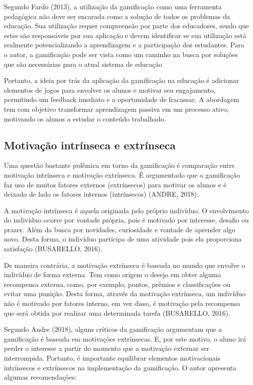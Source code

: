 \documentclass[
	12pt,				%
	oneside,			%
	a4paper,			%
	english,			%
	french,				%
	spanish,			%
	brazil,				%
	]{abntex2}
\begin{document}
Segundo Fardo (2013), a utilização da gamificação como uma ferramenta pedagógica não deve ser encarada como a solução de todos os problemas da educação. Sua utilização requer compreensão por parte dos educadores, sendo que estes são responsáveis por sua aplicação e devem identificar se sua utilização está realmente potencializando a aprendizagem e a participação dos estudantes. Para o autor, a gamificação pode ser vista como um caminho na busca por soluções que são necessárias para o atual sistema de educação

Portanto, a ideia por trás da aplicação da gamificação na educação é adicionar elementos de jogos para envolver os alunos e motivar seu engajamento, permitindo um feedback imediato e a oportunidade de fracassar. A abordagem tem com objetivo transformar aprendizagem passiva em um processo ativo, motivando os alunos a estudar o conteúdo trabalhado.

\subsection{Motivação intrínseca e extrínseca}

Uma questão bastante polêmica em torno da gamificação é comparação entre motivação intrínseca e motivação extrínseca. É argumentado que a gamificação faz uso de muitos fatores externos (extrínsecos) para motivar os alunos e é deixado de lado os fatores internos (intrínsecos) (ANDRE, 2018).

A motivação intrínseca é aquela originada pelo próprio indivíduo. O envolvimento do indivíduo ocorre por vontade própria,  pois é motivado por interesse, desafio ou prazer. Além da busca por novidades, curiosidade e vontade de aprender algo novo. Desta forma, o indivíduo participa de uma atividade pois ela proporciona satisfação (BUSARELLO, 2016).

De maneira contrária, a motivação extrínseca é baseada no mundo que envolve o indivíduo de forma externa. Tem como origem o desejo em obter alguma recompensa externa, como, por exemplo, pontos, prêmios e classificações ou evitar uma punição. Desta forma, através da motivação extrínseca, um indivíduo não é motivado por fatores interno, em vez disso, é motivação pela recompensa que será obtida por realizar uma determinada tarefa (BUSARELLO, 2016).

Segundo Andre (2018), alguns críticos da gamificação argumentam que a gamificação é baseada em motivações extrínsecas. E, por este motivo, o aluno irá perder o interesse a partir do momento que a motivação externar ser interrompida. Portanto, é importante equilibrar elementos motivacionais intrínsecos e extrínsecos na implementação da gamificação. O autor apresenta algumas recomendações:
\end{document}
